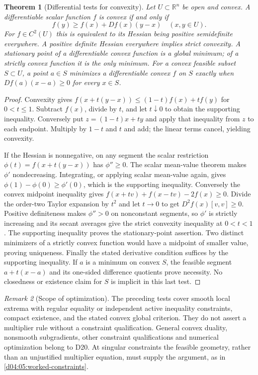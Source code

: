 \documentclass[11pt,oneside,openany]{book}
\newtheorem{theorem}{Theorem}[chapter]
\theoremstyle{definition}
\theoremstyle{remark}
\newtheorem{remark}[theorem]{Remark}
\newcommand{\R}{\mathbb R}
\begin{document}
\begin{theorem}[Differential tests for convexity]\label{d04:05:convexity}
Let $U\subset\R^n$ be open and convex. A differentiable scalar function
$f$ is convex if and only if
\[
 f(y)\geq f(x)+Df(x)(y-x)\quad(x,y\in U).
\]
For $f\in C^2(U)$ this is equivalent to its Hessian being positive
semidefinite everywhere. A positive definite Hessian everywhere implies
strict convexity. A stationary point of a differentiable convex function
is a global minimum; of a strictly convex function it is the only minimum.
For a convex feasible subset $S\subset U$, a point $a\in S$ minimizes
a differentiable convex $f$ on $S$ exactly when
$Df(a)(x-a)\geq0$ for every $x\in S$.
\end{theorem}
\begin{proof}
Convexity gives
$f(x+t(y-x))\leq(1-t)f(x)+tf(y)$ for $0<t\leq1$.
Subtract $f(x)$, divide by $t$, and let $t\downarrow0$ to obtain the
supporting inequality. Conversely put $z=(1-t)x+ty$ and apply that
inequality from $z$ to each endpoint. Multiply by $1-t$ and $t$ and add;
the linear terms cancel, yielding convexity.

If the Hessian is nonnegative, on any segment the scalar restriction
$\phi(t)=f(x+t(y-x))$ has $\phi''\geq0$. The scalar mean-value theorem
makes $\phi'$ nondecreasing. Integrating, or applying scalar mean-value
again, gives $\phi(1)-\phi(0)\geq\phi'(0)$, which is the supporting
inequality. Conversely the convex midpoint inequality gives
$f(x+tv)+f(x-tv)-2f(x)\geq0$. Divide the order-two Taylor expansion
by $t^2$ and let $t\to0$ to get $D^2f(x)[v,v]\geq0$.
Positive definiteness makes $\phi''>0$ on nonconstant segments, so
$\phi'$ is strictly increasing and its secant averages give the strict
convexity inequality at $0<t<1$. The supporting inequality proves the
stationary-point assertion. Two distinct minimizers of a strictly convex
function would have a midpoint of smaller value, proving uniqueness.
Finally the stated derivative condition suffices by the supporting
inequality. If $a$ is a minimum on convex $S$, the feasible segment
$a+t(x-a)$ and its one-sided difference quotients prove necessity.
No closedness or existence claim for $S$ is implicit in this last test.
\end{proof}

\begin{remark}[Scope of optimization]\label{d04:05:optimization-scope}
The preceding tests cover smooth local extrema with regular equality or
independent active inequality constraints, compact existence, and the stated
convex global criterion. They do not assert a multiplier rule without a
constraint qualification. General convex duality, nonsmooth subgradients,
other constraint qualifications and numerical optimization belong to D20.
At singular constraints the feasible geometry, rather than an unjustified
multiplier equation, must supply the argument, as in
\cref{d04:05:worked-constraints}.
\end{remark}
\end{document}
